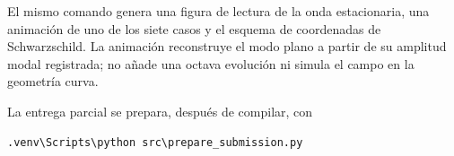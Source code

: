 El mismo comando genera una figura de lectura de la onda estacionaria,
una animación de uno de los siete casos y el esquema de coordenadas de
Schwarzschild. La animación reconstruye el modo plano a partir de su
amplitud modal registrada; no añade una octava evolución ni simula el
campo en la geometría curva.

La entrega parcial se prepara, después de compilar, con
\begin{verbatim}
.venv\Scripts\python src\prepare_submission.py
\end{verbatim}
